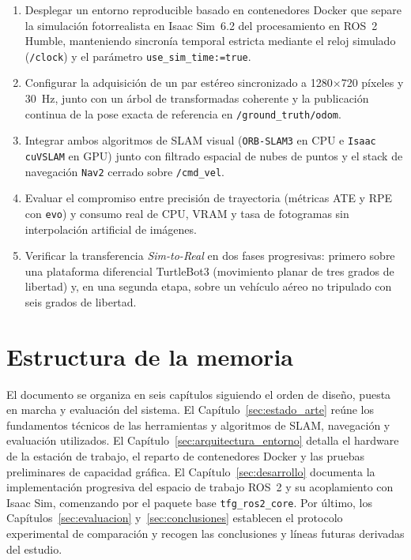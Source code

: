 \begin{enumerate}
  \item Desplegar un entorno reproducible basado en contenedores Docker que separe la simulación fotorrealista en Isaac Sim~6.2 del procesamiento en ROS~2 Humble, manteniendo sincronía temporal estricta mediante el reloj simulado (\texttt{/clock}) y el parámetro \texttt{use\_sim\_time:=true}.
  \item Configurar la adquisición de un par estéreo sincronizado a \num{1280}\(\times\)\num{720} píxeles y \qty{30}{\hertz}, junto con un árbol de transformadas coherente y la publicación continua de la pose exacta de referencia en \texttt{/ground\_truth/odom}.
  \item Integrar ambos algoritmos de SLAM visual (\texttt{ORB-SLAM3} en CPU e \texttt{Isaac cuVSLAM} en GPU) junto con filtrado espacial de nubes de puntos y el stack de navegación \texttt{Nav2} cerrado sobre \texttt{/cmd\_vel}.
  \item Evaluar el compromiso entre precisión de trayectoria (métricas ATE y RPE con \texttt{evo}) y consumo real de CPU, VRAM y tasa de fotogramas sin interpolación artificial de imágenes.
  \item Verificar la transferencia \textit{Sim-to-Real} en dos fases progresivas: primero sobre una plataforma diferencial TurtleBot3 (movimiento planar de tres grados de libertad) y, en una segunda etapa, sobre un vehículo aéreo no tripulado con seis grados de libertad.
\end{enumerate}


\section{Estructura de la memoria}
\label{sec:estructura_memoria}

El documento se organiza en seis capítulos siguiendo el orden de diseño, puesta en marcha y evaluación del sistema. El Capítulo~\ref{sec:estado_arte} reúne los fundamentos técnicos de las herramientas y algoritmos de SLAM, navegación y evaluación utilizados. El Capítulo~\ref{sec:arquitectura_entorno} detalla el hardware de la estación de trabajo, el reparto de contenedores Docker y las pruebas preliminares de capacidad gráfica. El Capítulo~\ref{sec:desarrollo} documenta la implementación progresiva del espacio de trabajo ROS~2 y su acoplamiento con Isaac Sim, comenzando por el paquete base \texttt{tfg\_ros2\_core}. Por último, los Capítulos~\ref{sec:evaluacion} y~\ref{sec:conclusiones} establecen el protocolo experimental de comparación y recogen las conclusiones y líneas futuras derivadas del estudio.

